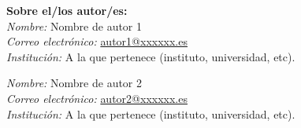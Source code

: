 \documentclass[a4paper,10pt,twoside]{article}
\begin{document}
\begin{thebibliography}{9}
\begin{comment}
\bibitem{segal2}
------,
\textit{Mathematics and German Politics: The National Socialist Experience},
Historia Mathematica, Nº 13, pp. 118--135, 1986.

\bibitem{siegmund}
\textsc{Siegmund-Schultze}, R., 
\textit{Mathematicians fleeing from Nazi Germany. Individual Fates and Global Impact},
Princeton University Press, 2009.

\bibitem{siegmund2}
------,
\textit{Emigration of mathematicians and of mathematics: facts and open questions}, 
Emigration of Mathematicians and Transmission of Mathematics: Historical Lessons and Consequences of the Third Reich,
Mathematisches Forschungsinstitut Oberwolfach, Nº 51, 2011.

\bibitem{singh}
\textsc{Singh}, S., 
\textit{Los Códigos Secretos: El arte y la ciencia de la criptografía, desde el antiguo Egipto a la era Internet}, Editorial Debate, 2000.  

\bibitem{smith}
\textsc{Smith}, D., \textsc{Simmons}, C., 
\textit{The Effect of the Nazi Regime on the World of Mathematics and Individual Mathematicians},
University of Central Oklahoma, 2010.

\bibitem{tobies}
\textsc{Tobies}, R.,
\textit{Expelled female mathematicians in exile: working conditions, and the impact on pure and applied mathematics}, 
Emigration of Mathematicians and Transmission of Mathematics: Historical Lessons and Consequences of the Third Reich,
Mathematisches Forschungsinstitut Oberwolfach, Nº 51, 2011.
\end{comment}

\end{thebibliography}



\vspace{1cm}
\noindent\textbf{Sobre el/los autor/es:}\\
\emph{Nombre:} Nombre de autor 1\\
\emph{Correo electrónico:} \href{mailto:autor1@xxxxxx.es}{autor1@xxxxxx.es}\\
\emph{Institución:} A la que pertenece (instituto, universidad, etc).

\noindent\emph{Nombre:} Nombre de autor 2\\
\emph{Correo electrónico:} \href{mailto:autor2@xxxxxx.es}{autor2@xxxxxx.es}\\
\emph{Institución:} A la que pertenece (instituto, universidad, etc).\\
\end{document}

